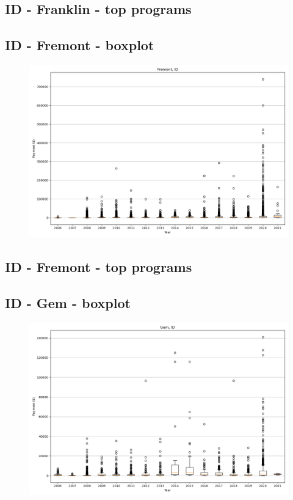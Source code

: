 \subsection*{ID - Franklin - top programs}

\newpage
\subsection*{ID - Fremont - boxplot}
\begin{figure}[h]
\centering
\includegraphics[width=7in]{../output/boxplots/counties/Fremont-ID_boxplot.png}
\end{figure}


\subsection*{ID - Fremont - top programs}

\newpage
\subsection*{ID - Gem - boxplot}
\begin{figure}[h]
\centering
\includegraphics[width=7in]{../output/boxplots/counties/Gem-ID_boxplot.png}
\end{figure}


